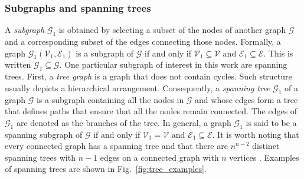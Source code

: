 \subsubsection{Subgraphs and spanning trees}
A \emph{subgraph} $\mathcal{G}_1$ is obtained by selecting a subset of the nodes of another graph $\mathcal{G}$ and a corresponding subset of the edges connecting those nodes. Formally, a graph $\mathcal{G}_1\left(\mathcal{V}_1, \mathcal{E}_1\right)$ is a subgraph of $\mathcal{G}$ if and only if $\mathcal{V}_1 \subseteq  \mathcal{V}$ and $\mathcal{E}_1 \subseteq \mathcal{E}$. This is written $\mathcal{G}_1 \subseteq \mathcal{G}$. One particular subgraph of interest in this work are spanning trees. First, a \emph{tree graph} is a graph that does not contain cycles. Such structure usually depicts a hierarchical arrangement. Consequently, a \emph{spanning tree} $\mathcal{G}_1$ of a graph $\mathcal{G}$ is a subgraph containing all the nodes in $\mathcal{G}$ and whose edges form a tree that defines paths that ensure that all the nodes remain connected. The edges of $\mathcal{G}_1$ are denoted as the branches of the tree. In general, a graph $\mathcal{G}_1$ is said to be a spanning subgraph of $\mathcal{G}$ if and only if $\mathcal{V}_1 = \mathcal{V}$ and $\mathcal{E}_1 \subseteq \mathcal{E}$. It is worth noting that every connected graph has a spanning tree and that there are $n^{n-2}$ distinct spanning trees with $n - 1$ edges on a connected graph with $n$ vertices \cite{West2001Introductiongraphtheory}. Examples of spanning trees are shown in Fig.~\ref{fig:tree_examples}.

